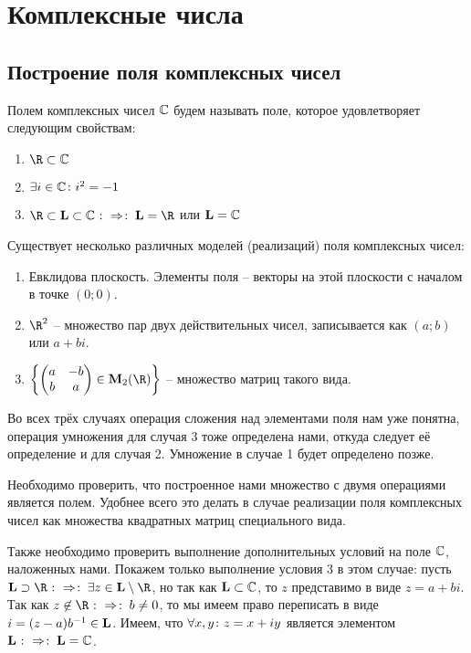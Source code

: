 \newpage
\section{Комплексные числа}
\label{complex}
%

\subsection{Построение поля комплексных чисел}

Полем комплексных чисел $\mathbb{C}$ будем называть поле, которое удовлетворяет следующим свойствам:
\begin{enumerate}
  \item $\R\subset\Cbb$
  \item $\exists i\in\mathbb{C}\colon i^2=-1$
  \item $\R\subset\Lb\subset\Cbb\ra\Lb=\R$ или $\mathbf{L}=\mathbb{C}$
\end{enumerate}

Существует несколько различных моделей (реализаций) поля комплексных чисел:
\begin{enumerate}
  \item Евклидова плоскость. Элементы поля -- векторы на этой плоскости с началом в точке $(0;0)$.
  \item $\R^2$ -- множество пар двух действительных чисел, записывается как $(a;b)$ или $a+bi$.
  \item $\left\{\left(\begin{matrix}a&-b\\ b&a\end{matrix}\right)\in\Mb_2(\R) \right\}$ -- множество матриц такого вида.
\end{enumerate}

Во всех трёх случаях операция сложения над элементами поля нам уже понятна, операция умножения для случая 3 тоже определена нами, откуда следует её определение и для случая 2. Умножение в случае 1 будет определено позже.

Необходимо проверить, что построенное нами множество с двумя операциями является полем. Удобнее всего это делать в случае реализации поля комплексных чисел как множества квадратных матриц специального вида.

Также необходимо проверить выполнение дополнительных условий на поле $\mathbb{C}$, наложенных нами. Покажем только выполнение условия 3 в этом случае: пусть $\Lb\supset\R\ra \exists z\in\Lb\setminus\R$, но так как $\mathbf{L}\subset\mathbb{C}$, то $z$ представимо в виде $z=a+bi$. Так как $z\not\in\R\ra b\ne0$, то мы имеем право переписать в виде $i=(z-a)b^{-1}\in\mathbf{L}$. Имеем, что $\forall x,y\colon z=x+iy$ является элементом $\mathbf{L}\mathbin{\colon\Rightarrow \colon}\mathbf{L}=\mathbb{C}$.

